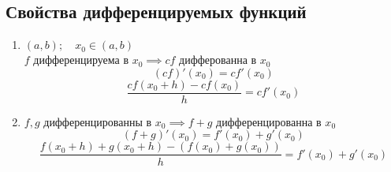 \subsection{Свойства дифференцируемых функций}
\begin{properties}
	\begin{enumerate}
		\item $(a,b); \quad x_0 \in (a,b)$ \\
			$f$ дифференцируема в $x_0 \implies cf$ дифферованна в $x_0$
			\[
				(cf)'(x_0)=cf'(x_0)
			\]
			\[
			\displaystyle\frac{cf(x_0+h)-cf(x_0)}{h}=cf'(x_0)
			\]
		\item $f,g$ дифференцированны в  $x_0 \implies f+g$ дифференцированна в $x_0$
			\[
				(f+g)'(x_0)=f'(x_0)+g'(x_0)
			\]
			\[
			\displaystyle\frac{f(x_0+h)+g(x_0+h)-(f(x_0)+g(x_0))}{h}=f'(x_0)+g'(x_0)
			\] 
	\end{enumerate}
\end{properties}